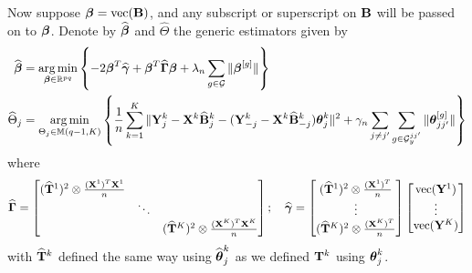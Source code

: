 \documentclass[12pt, letterpaper]{article}
\DeclareMathOperator*{\ve}{vec}
\DeclareMathOperator*{\argmin}{arg\,min}
\numberwithin{equation}{section}
\begin{document}
Now suppose $\bfbeta = \ve (\bfB)$, and any subscript or superscript on ${\mathbf{B}}$ will be passed on to ${\boldsymbol{\beta}}$. Denote by $\widehat {{\boldsymbol{\beta}}}$ and $\widehat \Theta$ the generic estimators given by
%
\begin{align}
\widehat \bfbeta &= \argmin_{\bfbeta \in \BR^{pq}} \left\{-2 \bfbeta^T \widehat \bfgamma + \bfbeta^T \widehat \bfGamma \bfbeta + \lambda_n \sum_{g \in \cG} \| \bfbeta^{[g]}  \| \right\} \label{eqn:EstEqn1}\\
\widehat \Theta_j &= \argmin_{\Theta_j \in \BM(q-1, K)} \left\{ \frac{1}{n} \sum_{k=1}^K \| \bfY^k_j - \bfX^k \widehat \bfB_j^k - (\bfY_{-j}^k - \bfX^k \widehat \bfB^k_{-j} ) \bftheta_j^k \|^2 + \gamma_n \sum_{j \neq j'} \sum_{g \in \cG_y^{jj'}} \| \bftheta_{jj'}^{[g]} \| \right\} \label{eqn:EstEqn2}
\end{align}
%
where
%
$$
\widehat \bfGamma = \begin{bmatrix}
(\widehat \bfT^1)^2 \otimes \frac{(\bfX^1)^T \bfX^1}{n} & &\\
& \ddots &\\
& & (\widehat \bfT^K)^2 \otimes \frac{(\bfX^K)^T \bfX^K}{n}
\end{bmatrix}; \quad
\widehat \bfgamma = \begin{bmatrix}
(\widehat \bfT^1)^2 \otimes \frac{(\bfX^1)^T}{n}\\
\vdots\\
(\widehat \bfT^K)^2 \otimes \frac{(\bfX^K)^T}{n}
\end{bmatrix}
\begin{bmatrix}
\ve (\bfY^1)\\
\vdots\\
\ve (\bfY^K)
\end{bmatrix}
$$
with $\widehat {{\mathbf{T}}}^k$ defined the same way using $\widehat {{\boldsymbol{\theta}}}_j^k$ as we defined ${\mathbf{T}}^k$ using ${\boldsymbol{\theta}}_j^k$.
\end{document}
